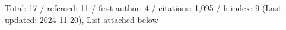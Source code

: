 Total: 17 / refereed: 11 / first author: 4 / citations: 1,095 / h-index: 9 (Last updated: 2024-11-20), List attached below